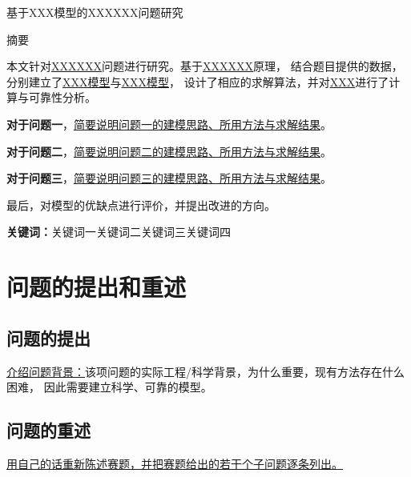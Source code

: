\documentclass[a4paper,12pt]{article}
\begin{document}
\songti{}
\setlength{\parindent}{2em}

\begin{center}
    \songti{}
    \heiti{} 基于XXX模型的XXXXXX问题研究
\end{center}

\begin{center}
  \heiti{} 摘\quad 要
\end{center}

{
\songti{}      %
\setlength{\parindent}{2em}

本文针对\underline{XXXXXX}问题进行研究。基于\underline{XXXXXX}原理，
结合题目提供的数据，分别建立了\underline{XXX模型}与\underline{XXX模型}，
设计了相应的求解算法，并对\underline{XXX}进行了计算与可靠性分析。

\textbf{对于问题一}，\underline{简要说明问题一的建模思路、所用方法与求解结果}。

\textbf{对于问题二}，\underline{简要说明问题二的建模思路、所用方法与求解结果}。

\textbf{对于问题三}，\underline{简要说明问题三的建模思路、所用方法与求解结果}。

最后，对模型的优缺点进行评价，并提出改进的方向。

\textbf{关键词：}关键词一\quad 关键词二\quad 关键词三\quad 关键词四
}

\clearpage


\section{问题的提出和重述}

\subsection{问题的提出}
\underline{介绍问题背景：}该项问题的实际工程/科学背景，为什么重要，现有方法存在什么困难，
因此需要建立科学、可靠的模型。

\subsection{问题的重述}
\underline{用自己的话重新陈述赛题，并把赛题给出的若干个子问题逐条列出。}
\end{document}
